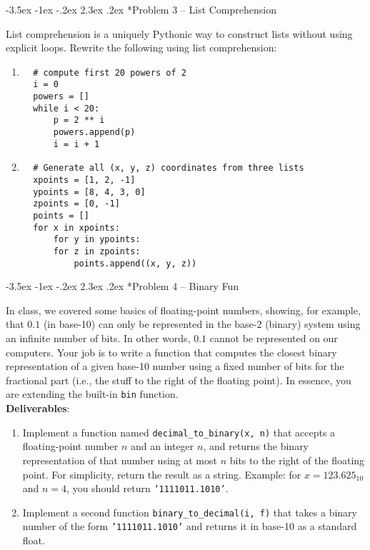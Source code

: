 \documentclass[11pt]{article}
\makeatletter
\renewcommand\section{\@startsection{section}{1}{\z@}%
                                  {-3.5ex \@plus -1ex \@minus -.2ex}%
                                  {2.3ex \@plus.2ex}%
                                  {\normalfont\bfseries}}
\makeatother
\begin{document}
\section*{Problem 3 -- List Comprehension}

List comprehension is a uniquely Pythonic way to construct lists
without using explicit loops.  Rewrite the following using list 
comprehension:

\begin{enumerate}
 \item 
  \begin{verbatim}
  # compute first 20 powers of 2
  i = 0
  powers = []
  while i < 20:
      p = 2 ** i
      powers.append(p)
      i = i + 1
  \end{verbatim}
 \item 
  \begin{verbatim}
  # Generate all (x, y, z) coordinates from three lists
  xpoints = [1, 2, -1]
  ypoints = [8, 4, 3, 0]
  zpoints = [0, -1]
  points = []
  for x in xpoints:
      for y in ypoints:
	  for z in zpoints:
	      points.append((x, y, z))
  \end{verbatim}
  
\end{enumerate}
  
\section*{Problem 4 -- Binary Fun}

In class, we covered some basics of floating-point numbers, showing,
for example, that $0.1$ (in base-10) can only be represented 
in the base-2 (binary) system using an infinite number of bits.
In other words, $0.1$ cannot be represented on our computers.  Your 
job is to write a function that computes the closest binary
representation of a given base-10 number using a fixed number of 
bits for the fractional part (i.e., the stuff to the right of 
the floating point).  In essence, you are extending 
the built-in {\tt bin} function. \\

{\bf Deliverables}:
\begin{enumerate}
 \item Implement a function named {\tt decimal\_to\_binary(x, n)} 
       that accepts a floating-point number $n$ and an integer 
       $n$, and returns the binary representation of that 
       number using at most $n$ bits to the right of the 
       floating point.  For simplicity, return the 
       result as a string.  Example: for $x = 123.625_{10}$ and $n = 4$, you 
       should return {\tt '1111011.1010'}. 
 \item Implement a second function {\tt binary\_to\_decimal(i, f)} that 
       takes a binary number of the form  {\tt '1111011.1010'} and returns
       it in base-10 as a standard float.  
\end{enumerate}
\end{document}
